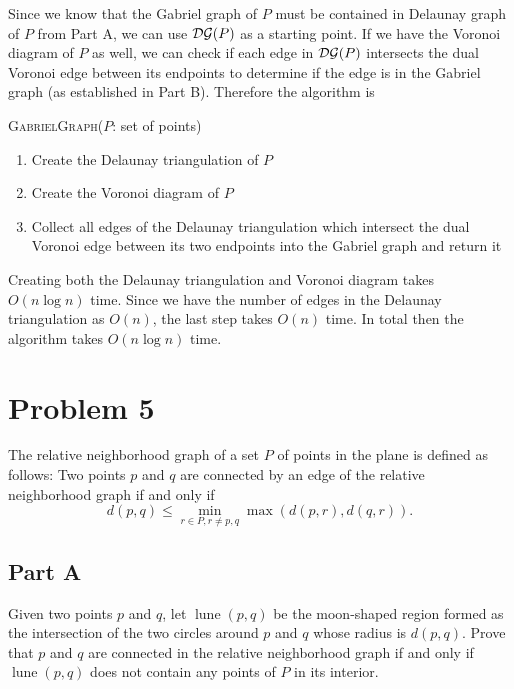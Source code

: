 \documentclass[12pt]{extarticle}
\DeclareMathOperator*{\lune}{lune}
\begin{document}
\begin{solution}
    Since we know that the Gabriel graph of $P$ must be contained in Delaunay graph of $P$ from Part A, we can use $\mathcal{DG}(P)$ as a starting point. If we have the Voronoi diagram of $P$ as well, we can check if each edge in $\mathcal{DG}(P)$ intersects the dual Voronoi edge between its endpoints to determine if the edge is in the Gabriel graph (as established in Part B). Therefore the algorithm is
    \begin{algorithm}[H]
        \caption{\textsc{GabrielGraph}($P$: set of points)}
        \begin{enumerate}
            \item Create the Delaunay triangulation of $P$
            \item Create the Voronoi diagram of $P$
            \item Collect all edges of the Delaunay triangulation which intersect the dual Voronoi edge between its two endpoints into the Gabriel graph and return it
        \end{enumerate}
    \end{algorithm}

    Creating both the Delaunay triangulation and Voronoi diagram takes $O(n \log n)$ time. Since we have the number of edges in the Delaunay triangulation as $O(n)$, the last step takes $O(n)$ time. In total then the algorithm takes $O(n \log n)$ time.
\end{solution}

\section*{Problem 5}
The relative neighborhood graph of a set $P$ of points in the plane is defined as follows: Two points $p$ and $q$ are connected by an edge of the relative neighborhood graph if and only if
\[
    d(p,q) \leq \min_{r \in P, r \neq p, q} \max(d(p,r), d(q,r))
.\]

\subsection*{Part A}
Given two points $p$ and $q$, let $\lune(p, q)$ be the moon-shaped region formed as the intersection of the two circles around $p$ and $q$ whose radius is $d(p, q)$. Prove that $p$ and $q$ are connected in the relative neighborhood graph if and only if $\lune(p, q)$ does not contain any points of $P$ in its interior.
\end{document}
